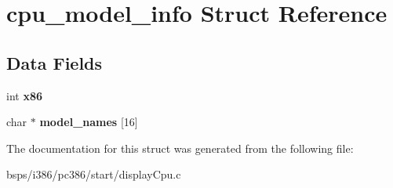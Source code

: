 \hypertarget{structcpu__model__info}{}\section{cpu\+\_\+model\+\_\+info Struct Reference}
\label{structcpu__model__info}
\subsection*{Data Fields}
\begin{DoxyCompactItemize}
\item 
\mbox{\label{structcpu__model__info_a0675385e3f4877f1b69dbf2cb8aa19b2}} 
int {\bfseries x86}
\item 
\mbox{\label{structcpu__model__info_a1fec78c3c4fc490f00d62e563f5c0cd8}} 
char $\ast$ {\bfseries model\+\_\+names} \mbox{[}16\mbox{]}
\end{DoxyCompactItemize}


The documentation for this struct was generated from the following file\+:\begin{DoxyCompactItemize}
\item 
bsps/i386/pc386/start/display\+Cpu.\+c\end{DoxyCompactItemize}
